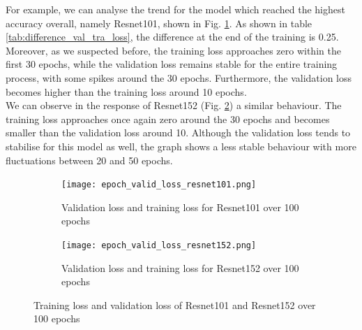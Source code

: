 For example, we can analyse the trend for the model which reached the highest accuracy overall, namely Resnet101, shown in Fig. \ref{fig:epoch_valid_loss_resnet101}. As shown in table \ref{tab:difference_val_tra_loss}, the difference at the end of the training is 0.25. Moreover, as we suspected before, the training loss approaches zero within the first 30 epochs, while the validation loss remains stable for the entire training process, with some spikes around the 30 epochs. Furthermore, the validation loss becomes higher than the training loss around 10 epochs.\\
We can observe in the response of Resnet152 (Fig. \ref{fig:epoch_valid_loss_resnet152}) a similar behaviour. The training loss approaches once again zero around the 30 epochs and becomes smaller than the validation loss around 10. Although the validation loss tends to stabilise for this model as well, the graph shows a less stable behaviour with more fluctuations between 20 and 50 epochs. \\
\begin{figure}[h]
\begin{subfigure}{0.5\textwidth}
     \centering
	    \texttt{[image: epoch\_valid\_loss\_resnet101.png]}
\caption{Validation loss and training loss for Resnet101 over 100 epochs}\label{fig:epoch_valid_loss_resnet101}
     \end{subfigure}
\begin{subfigure}{0.5\textwidth}
     \centering
	    \texttt{[image: epoch\_valid\_loss\_resnet152.png]}
\caption{Validation loss and training loss for Resnet152 over 100 epochs}\label{fig:epoch_valid_loss_resnet152}
     \end{subfigure}  
     \caption{Training loss and validation loss of Resnet101 and Resnet152 over 100 epochs}
        \label{fig:tran_valid_loss_seeds_res_100}
\end{figure}

